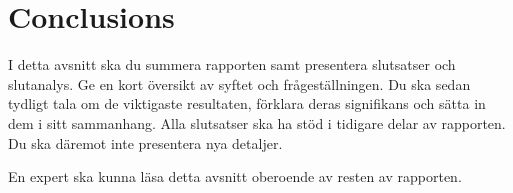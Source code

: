 \section{Conclusions}

{\color{blue} I detta avsnitt ska du summera rapporten samt presentera slutsatser och slutanalys. Ge en kort \"oversikt av syftet och fr\r{a}gest\"allningen. Du ska sedan tydligt tala om de viktigaste resultaten, f\"orklara deras signifikans och s\"atta in dem i sitt sammanhang. Alla slutsatser ska ha st\"od i tidigare delar av rapporten.  Du ska d\"aremot inte presentera nya detaljer.

En expert ska kunna l\"asa detta avsnitt oberoende av resten av rapporten. }
